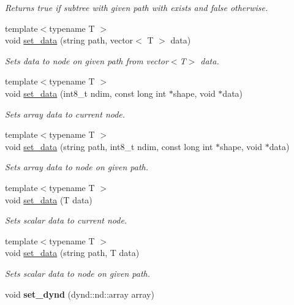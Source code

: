 \begin{DoxyCompactItemize}
\begin{DoxyCompactList}\small\item\em Returns true if subtree with given path with exists and false otherwise. \end{DoxyCompactList}\item 
{\footnotesize template$<$typename T $>$ }\\void \hyperlink{a00003_a9462ce2e878c8e978e38a9f71188973b}{set\+\_\+data} (string path, vector$<$ T $>$ data)
\begin{DoxyCompactList}\small\item\em Sets data to node on given path from vector$<$\+T$>$ data. \end{DoxyCompactList}\item 
{\footnotesize template$<$typename T $>$ }\\void \hyperlink{a00003_a42e2debec93119c4e79ddefb49ff5c43}{set\+\_\+data} (int8\+\_\+t ndim, const long int $\ast$shape, void $\ast$data)
\begin{DoxyCompactList}\small\item\em Sets array data to current node. \end{DoxyCompactList}\item 
{\footnotesize template$<$typename T $>$ }\\void \hyperlink{a00003_a009b92dac161a40dc8e17231a4575c1a}{set\+\_\+data} (string path, int8\+\_\+t ndim, const long int $\ast$shape, void $\ast$data)
\begin{DoxyCompactList}\small\item\em Sets array data to node on given path. \end{DoxyCompactList}\item 
{\footnotesize template$<$typename T $>$ }\\void \hyperlink{a00003_a4465da11f7821ef4d405cd8805d77459}{set\+\_\+data} (T data)
\begin{DoxyCompactList}\small\item\em Sets scalar data to current node. \end{DoxyCompactList}\item 
{\footnotesize template$<$typename T $>$ }\\void \hyperlink{a00003_a5a15d6128e566f802263c3fbf69a1d49}{set\+\_\+data} (string path, T data)
\begin{DoxyCompactList}\small\item\em Sets scalar data to node on given path. \end{DoxyCompactList}\item 
void {\bfseries set\+\_\+dynd} (dynd\+::nd\+::array array)\hypertarget{a00003_a4fae038574f9adbc8b6dbb8524677097}{}\label{a00003_a4fae038574f9adbc8b6dbb8524677097}


\end{DoxyCompactItemize}
